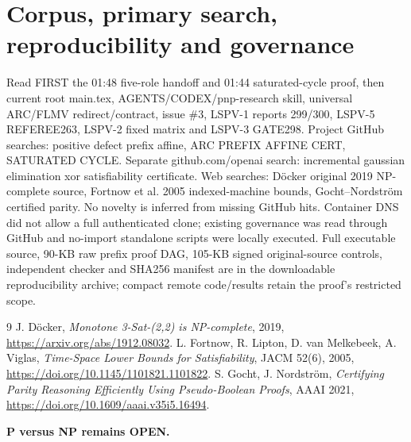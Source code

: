 \documentclass[11pt]{article}
\begin{document}
\section{Corpus, primary search, reproducibility and governance}
Read FIRST the 01:48 five-role handoff and 01:44 saturated-cycle proof, then current root main.tex, AGENTS/CODEX/pnp-research skill, universal ARC/FLMV redirect/contract, issue \#3, LSPV-1 reports 299/300, LSPV-5 REFEREE263, LSPV-2 fixed matrix and LSPV-3 GATE298. Project GitHub searches: positive defect prefix affine, ARC PREFIX AFFINE CERT, SATURATED CYCLE. Separate github.com/openai search: incremental gaussian elimination xor satisfiability certificate. Web searches: D\"ocker original 2019 NP-complete source, Fortnow et al. 2005 indexed-machine bounds, Gocht--Nordstr\"om certified parity. No novelty is inferred from missing GitHub hits. Container DNS did not allow a full authenticated clone; existing governance was read through GitHub and no-import standalone scripts were locally executed. Full executable source, 90-KB raw prefix proof DAG, 105-KB signed original-source controls, independent checker and SHA256 manifest are in the downloadable reproducibility archive; compact remote code/results retain the proof's restricted scope.

\begin{thebibliography}{9}
 J. D\"ocker, \emph{Monotone 3-Sat-(2,2) is NP-complete}, 2019, \url{https://arxiv.org/abs/1912.08032}.
 L. Fortnow, R. Lipton, D. van Melkebeek, A. Viglas, \emph{Time-Space Lower Bounds for Satisfiability}, JACM 52(6), 2005, \url{https://doi.org/10.1145/1101821.1101822}.
 S. Gocht, J. Nordstr\"om, \emph{Certifying Parity Reasoning Efficiently Using Pseudo-Boolean Proofs}, AAAI 2021, \url{https://doi.org/10.1609/aaai.v35i5.16494}.
\end{thebibliography}
\noindent\textbf{P versus NP remains OPEN.}
\end{document}
